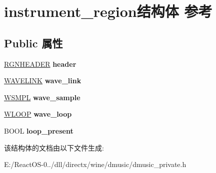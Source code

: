 \hypertarget{structinstrument__region}{}\section{instrument\+\_\+region结构体 参考}
\label{structinstrument__region}
\subsection*{Public 属性}
\begin{DoxyCompactItemize}
\item 
\mbox{\label{structinstrument__region_a684898fc5409cb8b2f05213334428709}} 
\hyperlink{struct___r_g_n_h_e_a_d_e_r}{R\+G\+N\+H\+E\+A\+D\+ER} {\bfseries header}
\item 
\mbox{\label{structinstrument__region_ac04025deb24f43c1a9d6e2b719af1aec}} 
\hyperlink{struct___w_a_v_e_l_i_n_k}{W\+A\+V\+E\+L\+I\+NK} {\bfseries wave\+\_\+link}
\item 
\mbox{\label{structinstrument__region_a9bbc0f527b40fa08af377c8e229d0daf}} 
\hyperlink{struct__rwsmp}{W\+S\+M\+PL} {\bfseries wave\+\_\+sample}
\item 
\mbox{\label{structinstrument__region_a1ce410ee1d8a701f1c1f46ab77b8af30}} 
\hyperlink{struct__rloop}{W\+L\+O\+OP} {\bfseries wave\+\_\+loop}
\item 
\mbox{\label{structinstrument__region_affa4ef89a3d494cb1189959a73db9c82}} 
B\+O\+OL {\bfseries loop\+\_\+present}
\end{DoxyCompactItemize}


该结构体的文档由以下文件生成\+:\begin{DoxyCompactItemize}
\item 
E\+:/\+React\+O\+S-\/0../dll/directx/wine/dmusic/dmusic\+\_\+private.\+h\end{DoxyCompactItemize}

